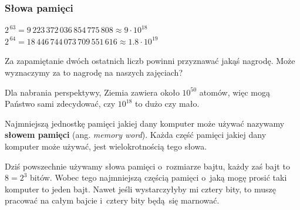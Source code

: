 \documentclass[10pt,t]{beamer}
\begin{document}
\begin{frame}
  \frametitle{Słowa pamięci}


  $2^{ \, 63 } = 9 \, 223 \, 372 \, 036 \, 854 \, 775 \, 808
  \approx 9 \cdot 10^{ 18 }$ \\
  $2^{ \, 64 } = 18 \, 446 \, 744 \, 073 \, 709 \, 551 \, 616
  \approx 1.8 \cdot 10^{ 19 }$

  Za zapamiętanie dwóch ostatnich liczb powinni przyznawać jakąś nagrodę.
  Może wyznaczymy za to nagrodę na naszych zajęciach?

  Dla nabrania perspektywy, Ziemia zawiera około $10^{ 50 }$ atomów, więc
  mogą Państwo sami zdecydować, czy $10^{ 18 }$ to dużo czy mało.

  Najmniejszą jednostkę pamięci jakiej dany komputer może używać nazywamy
  \textbf{słowem pamięci} (ang. \textit{memory word}). Każda część pamięci
  jakiej dany komputer może używać, jest wielokrotnością tego słowa.

  Dziś powszechnie używamy słowa pamięci o~rozmiarze bajtu, każdy
  zaś bajt to $8 = 2^{ 3 }$ bitów. Wobec tego najmniejszą częścią pamięci
  o~jaką mogę prosić taki komputer to jeden bajt. Nawet jeśli wystarczyłyby
  mi cztery bity, to muszę pracować na całym bajcie i~cztery bity będą~się
  marnować.

\end{frame}
\end{document}
